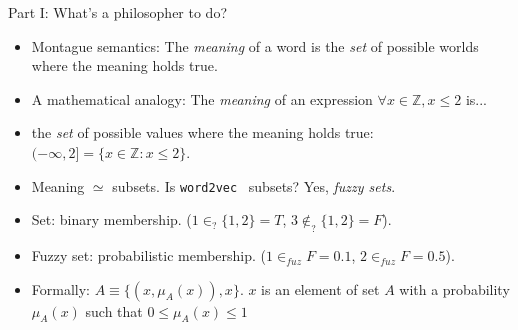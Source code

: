 \documentclass[8pt]{beamer}
\newcommand{\Z}{\mathbb Z}
\newcommand{\wtov}{\texttt{word2vec}}
\newcommand{\king}{\texttt{king}}
\newcommand{\man}{\texttt{man}}
\newcommand{\woman}{\texttt{woman}}
\newcommand{\queen}{\texttt{queen}}
\begin{document}

\begin{frame}{Part I: What's a philosopher to do?}
\begin{itemize}
    \item Montague semantics: The \emph{meaning} of a word is the \emph{set} of possible worlds where the meaning holds true. \pause
    \item A mathematical analogy: The \emph{meaning} of an expression $\forall x \in \Z, x \leq 2$ is... \pause
    \item  the \emph{set} of possible values where the meaning holds true: $(-\infty, 2] = \{  x \in \Z : x \leq 2 \}$. \pause
    \item Meaning $\simeq$ subsets. Is  \wtov~ subsets?  \pause Yes, \emph{fuzzy sets}. \pause
    \item Set: binary membership. ($1 \in_? \{1, 2\} = T$, $3 \not \in_? \{1, 2\} = F$). \pause
    \item Fuzzy set: probabilistic membership. ($1 \in_{fuz} F = 0.1$, $2 \in_{fuz} F = 0.5$).
    \item Formally:  $A \equiv \{ (x, \mu_A(x)), x \}$. $x$ is
      an element of set $A$ with a probability $\mu_A(x)$ such that $0 \leq \mu_A(x) \leq 1$
\end{itemize}
\end{frame}
\end{document}
